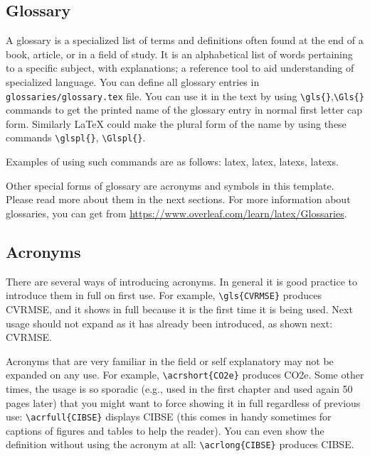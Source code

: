 \subsection{Glossary}
\label{subsec:Glossary}

A glossary is a specialized list of terms and definitions often found at the end of a book, article, 
or in a field of study. It is an alphabetical list of words pertaining to a specific subject, with explanations; 
a reference tool to aid understanding of specialized language. 
You can define all glossary entries in \verb|glossaries/glossary.tex| file. You can use it in the text by using \verb|\gls{}|,\verb|\Gls{}| commands to get the printed name of the glossary entry in normal first letter cap form.
Similarly \LaTeX{} could make the plural form of the name by using these commands \verb|\glspl{}|, \verb|\Glspl{}|.

Examples of using such commands are as follows: \gls{latex}, \Gls{latex}, \glspl{latex}, \Glspl{latex}.

Other special forms of glossary are acronyms and symbols in this template. Please read more about them in the next sections.
For more information about glossaries, you can get from \url{https://www.overleaf.com/learn/latex/Glossaries}.

\subsection{Acronyms}
\label{subsec:Acronyms}

There are several ways of introducing acronyms. 
In general it is good practice to introduce them in full on first use. 
For example, \verb|\gls{CVRMSE}| produces \gls{CVRMSE}, and it shows in full because 
it is the first time it is being used.
Next usage should not expand as it has already been introduced, as shown next: \gls{CVRMSE}.

Acronyms that are very familiar in the field or self explanatory may not be expanded on any use.
For example, \verb|\acrshort{CO2e}| produces \acrshort{CO2e}.
Some other times, the usage is so sporadic 
(e.g., used in the first chapter and used again 50 pages later)
that you might want to force showing it in full regardless of previous use: 
\verb|\acrfull{CIBSE}| displays \acrfull{CIBSE}
(this comes in handy sometimes for captions of figures and tables to help the reader).
You can even show the definition without using the acronym at all: 
\verb|\acrlong{CIBSE}| produces \acrlong{CIBSE}.


